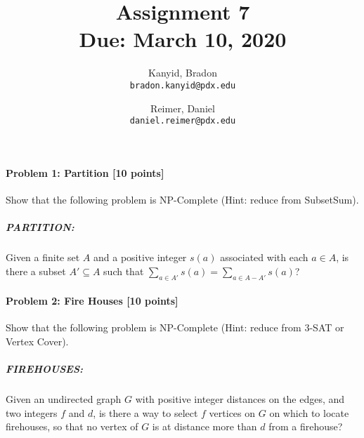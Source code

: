 \documentclass[11pt]{article}
\title{\bf Assignment 7 \\[2ex]
\rm\normalsize Due: March 10, 2020}
\date{}
\author{
  Kanyid, Bradon\\
  \texttt{bradon.kanyid@pdx.edu}
  \and
  Reimer, Daniel\\
  \texttt{daniel.reimer@pdx.edu}
}
\begin{document}
\maketitle

\begin{center}
\end{center}

\paragraph{Problem 1: Partition [10 points]}
Show that the following problem is NP-Complete (Hint: reduce from SubsetSum).
\subparagraph{PARTITION:} Given a finite set $A$ and a positive integer $s(a)$ associated with each $a \in A$, is there a subset $A' \subseteq A$ such that $\sum_{a \in A'} s(a) = \sum_{a \in A-A'} s(a)$?



\paragraph{Problem 2: Fire Houses [10 points]}
Show that the following problem is NP-Complete (Hint: reduce from 3-SAT or Vertex Cover).
\subparagraph{FIREHOUSES:} Given an undirected graph $G$ with positive integer distances on the edges, and
two integers $f$ and $d$, is there a way to select $f$ vertices on $G$ on which to locate firehouses, so that
no vertex of $G$ is at distance more than $d$ from a firehouse?


\end{document}
